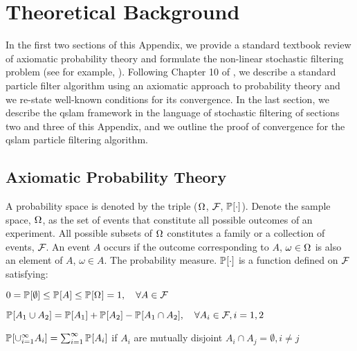 \section{Theoretical Background} \label{sec:appendix1}


In the first two sections of this Appendix, we provide a standard textbook review of axiomatic probability theory and formulate the non-linear stochastic filtering problem (see for example, \cite{bain2009,karlin1975}).  Following Chapter 10 of \cite{bain2009}, we describe a standard particle filter algorithm using an axiomatic approach to probability theory and we re-state well-known conditions for its convergence. In the last section, we describe the qslam framework in the language of stochastic filtering of sections two and three of this Appendix, and we outline the proof of convergence for the qslam particle filtering algorithm.

\subsection{Axiomatic Probability Theory}

\begin{defn} \label{defn:pspace} 
	
	A probability space is denoted by the triple ($\Omega_{{}}$, $ \mathcal{F}_{{}}$, $\mathbb{P}_{{}}{[\cdot]}$). Denote the sample space, $\Omega_{{}}$, as the set of events that constitute all possible outcomes of an experiment. All possible subsets of $\Omega_{{}}$ constitutes a family or a collection of events, $\mathcal{F}_{{}}$. An event $A$ occurs if the outcome corresponding to $A$, $\omega \in \Omega_{{}}$  is also an element of $A$, $\omega\in A$. The probability measure. $\mathbb{P}_{{}}{[\cdot]}$ is a function defined on $\mathcal{F}_{{}}$ satisfying:
	
	\begin{thmprop} 
		\item \label{defn:pspace:prop1} $ 0 = \mathbb{P}_{{}}{[\emptyset]} \leq \mathbb{P}_{{}}{[A]} \leq \mathbb{P}_{{}}{[\Omega_{{}}]} = 1, \quad \forall A \in \mathcal{F}_{{}}$
		\item \label{defn:pspace:prop2} $\mathbb{P}_{{}}{[A_1 \cup A_2]} = \mathbb{P}_{{}}{[A_1]}  + \mathbb{P}_{{}}{[A_2]}    - \mathbb{P}_{{}}{[A_1 \cap A_2]}, \quad \forall A_i \in \mathcal{F}_{{}}, i =1,2 $
		\item \label{defn:pspace:prop3} $\mathbb{P}_{{}}{[\cup_{i=1}^{\infty} A_i]} = \sum_{i=1}^{\infty} \mathbb{P}_{{}}{[A_i]}$ if $A_i$ are mutually disjoint $A_i \cap A_j = \emptyset, i \neq j$
	\end{thmprop}
\end{defn}

